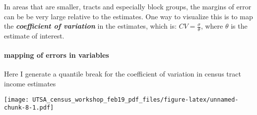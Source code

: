 \documentclass[]{article}
\newenvironment{Shaded}{\begin{snugshade}}{\end{snugshade}}
\newcommand{\KeywordTok}[1]{\textcolor[rgb]{0.13,0.29,0.53}{\textbf{#1}}}
\newcommand{\DataTypeTok}[1]{\textcolor[rgb]{0.13,0.29,0.53}{#1}}
\newcommand{\DecValTok}[1]{\textcolor[rgb]{0.00,0.00,0.81}{#1}}
\newcommand{\FloatTok}[1]{\textcolor[rgb]{0.00,0.00,0.81}{#1}}
\newcommand{\StringTok}[1]{\textcolor[rgb]{0.31,0.60,0.02}{#1}}
\newcommand{\OperatorTok}[1]{\textcolor[rgb]{0.81,0.36,0.00}{\textbf{#1}}}
\newcommand{\NormalTok}[1]{#1}
\let\oldparagraph\paragraph
\renewcommand{\paragraph}[1]{\oldparagraph{#1}\mbox{}}
\begin{document}
In areas that are smaller, tracts and especially block groups, the
margins of error can be be very large relative to the estimates. One way
to visualize this is to map the \textbf{\emph{coefficient of variation}}
in the estimates, which is: \(CV= \frac{\sigma}{\theta}\), where
\(\theta\) is the estimate of interest.

\paragraph{mapping of errors in
variables}\label{mapping-of-errors-in-variables}

Here I generate a quantile break for the coefficient of variation in
census tract income estimates

\begin{Shaded}
\end{Shaded}

\texttt{[image: UTSA\_census\_workshop\_feb19\_pdf\_files/figure-latex/unnamed-chunk-8-1.pdf]}
\end{document}
